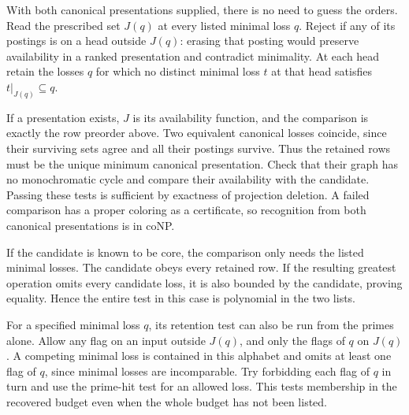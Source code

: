 With both canonical presentations supplied, there is
no need to guess the orders. Read the prescribed set
$J(q)$ at every listed minimal loss $q$. Reject if
any of its postings is on a head outside $J(q)$:
erasing that posting would preserve availability in
a ranked presentation and contradict minimality.
At each head retain the losses $q$ for which no
distinct minimal loss $t$ at that head satisfies
$t|_{J(q)}\subseteq q$.

If a presentation exists, $J$ is its availability
function, and the comparison is exactly the row
preorder above. Two equivalent canonical losses
coincide, since their surviving sets agree and all
their postings survive. Thus the retained rows must
be the unique minimum canonical presentation. Check
that their graph has no monochromatic cycle and
compare their availability with the candidate.
Passing these tests is sufficient by exactness of
projection deletion. A failed comparison has a
proper coloring as a certificate, so recognition
from both canonical presentations is in coNP.

If the candidate is known to be core, the comparison
only needs the listed minimal losses. The candidate
obeys every retained row. If the resulting greatest
operation omits every candidate loss, it is also
bounded by the candidate, proving equality. Hence
the entire test in this case is polynomial in the
two lists.

For a specified minimal loss $q$, its retention
test can also be run from the primes alone. Allow
any flag on an input outside $J(q)$, and only the
flags of $q$ on $J(q)$. A competing minimal loss is
contained in this alphabet and omits at least one
flag of $q$, since minimal losses are incomparable.
Try forbidding each flag of $q$ in turn and use
the prime-hit test for an allowed loss. This tests
membership in the recovered budget even when the
whole budget has not been listed.

